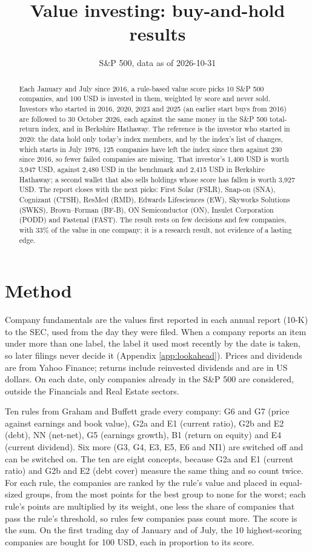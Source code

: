 \documentclass[11pt,a4paper]{article}
\title{Value investing: buy-and-hold results}
\author{S\&P 500, data as of 2026-10-31}
\date{}
\begin{document}
\maketitle
\begin{abstract}
Each January and July since 2016, a rule-based value score picks 10 S\&P 500 companies, and 100 USD is invested in them, weighted by score and never sold. Investors who started in 2016, 2020, 2023 and 2025 (an earlier start buys from 2016) are followed to 30 October 2026, each against the same money in the S\&P 500 total-return index, and in Berkshire Hathaway. The reference is the investor who started in 2020: the data hold only today's index members, and by the index's list of changes, which starts in July 1976, 125 companies have left the index since then against 230 since 2016, so fewer failed companies are missing. That investor's 1,400 USD is worth 3,947 USD, against 2,480 USD in the benchmark and 2,415 USD in Berkshire Hathaway; a second wallet that also sells holdings whose score has fallen is worth 3,927 USD. The report closes with the next picks: First Solar (FSLR), Snap-on (SNA), Cognizant (CTSH), ResMed (RMD), Edwards Lifesciences (EW), Skyworks Solutions (SWKS), Brown–Forman (BF-B), ON Semiconductor (ON), Insulet Corporation (PODD) and Fastenal (FAST). The result rests on few decisions and few companies, with 33\% of the value in one company; it is a research result, not evidence of a lasting edge.
\end{abstract}
\section{Method}
Company fundamentals are the values first reported in each annual report (10-K) to the SEC, used from the day they were filed. When a company reports an item under more than one label, the label it used most recently by the date is taken, so later filings never decide it (Appendix \ref{app:lookahead}). Prices and dividends are from Yahoo Finance; returns include reinvested dividends and are in US dollars. On each date, only companies already in the S\&P 500 are considered, outside the Financials and Real Estate sectors.

Ten rules from Graham and Buffett grade every company: G6 and G7 (price against earnings and book value), G2a and E1 (current ratio), G2b and E2 (debt), NN (net-net), G5 (earnings growth), B1 (return on equity) and E4 (current dividend). Six more (G3, G4, E3, E5, E6 and NI1) are switched off and can be switched on. The ten are eight concepts, because G2a and E1 (current ratio) and G2b and E2 (debt cover) measure the same thing and so count twice. For each rule, the companies are ranked by the rule's value and placed in equal-sized groups, from the most points for the best group to none for the worst; each rule's points are multiplied by its weight, one less the share of companies that pass the rule's threshold, so rules few companies pass count more. The score is the sum. On the first trading day of January and of July, the 10 highest-scoring companies are bought for 100 USD, each in proportion to its score.
\end{document}

